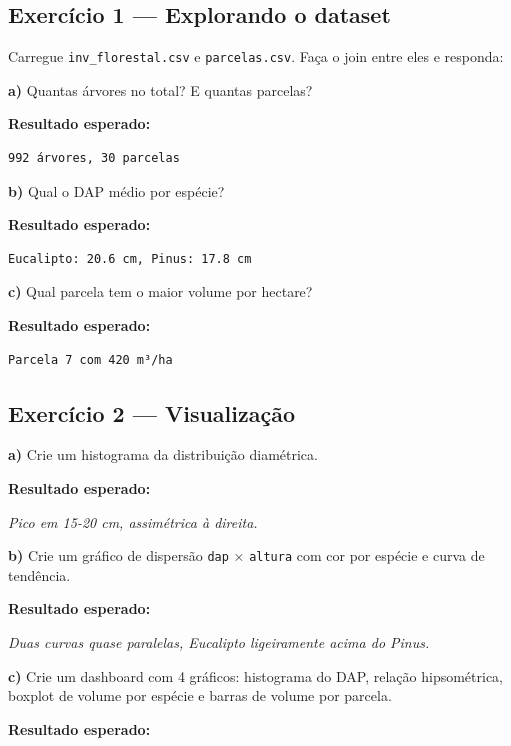 \documentclass[
  letterpaper,
]{scrbook}
\begin{document}
\subsection{Exercício 1 --- Explorando o
dataset}\label{exercuxedcio-1-explorando-o-dataset}

Carregue \texttt{inv\_florestal.csv} e \texttt{parcelas.csv}. Faça o
join entre eles e responda:

\textbf{a)} Quantas árvores no total? E quantas parcelas?

\textbf{Resultado esperado:}

\begin{verbatim}
992 árvores, 30 parcelas
\end{verbatim}

\textbf{b)} Qual o DAP médio por espécie?

\textbf{Resultado esperado:}

\begin{verbatim}
Eucalipto: 20.6 cm, Pinus: 17.8 cm
\end{verbatim}

\textbf{c)} Qual parcela tem o maior volume por hectare?

\textbf{Resultado esperado:}

\begin{verbatim}
Parcela 7 com 420 m³/ha
\end{verbatim}

\subsection{Exercício 2 ---
Visualização}\label{exercuxedcio-2-visualizauxe7uxe3o}

\textbf{a)} Crie um histograma da distribuição diamétrica.

\textbf{Resultado esperado:}

\emph{Pico em 15-20 cm, assimétrica à direita.}

\textbf{b)} Crie um gráfico de dispersão \texttt{dap} × \texttt{altura}
com cor por espécie e curva de tendência.

\textbf{Resultado esperado:}

\emph{Duas curvas quase paralelas, Eucalipto ligeiramente acima do
Pinus.}

\textbf{c)} Crie um dashboard com 4 gráficos: histograma do DAP, relação
hipsométrica, boxplot de volume por espécie e barras de volume por
parcela.

\textbf{Resultado esperado:}
\end{document}
